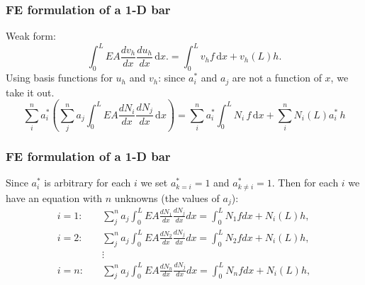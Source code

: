 \documentclass[notes]{beamer}
\begin{document}
\begin{frame}
\frametitle{FE formulation of a 1-D bar}
Weak form:
\begin{equation*}
\int_0^L EA \frac{dv_h}{dx} \frac{du_h}{dx}\, \mathrm{d}x. = \int_0^L v_h f\, \mathrm{d}x + v_h(L)h.
\end{equation*}
Using basis functions for $u_h$ and $v_h$:
since $a_i^*$  and $a_j$ are not a function of $x$, we take it out.
\begin{equation*}
	\sum_i^n a_i^* \left(\sum_j^n a_j \int_0^L EA \frac{dN_i}{dx}\frac{dN_j}{dx}\, \mathrm{d}x \right)  = \sum_i^n a_i^* \int_0^L N_i \,f\,\mathrm{d}x + \sum_i^n N_i(L) a_i^*\,h
\end{equation*}
\end{frame}


\begin{frame}
\frametitle{FE formulation of a 1-D bar}
Since $a_i^*$ is arbitrary for each $i$ we set $a_{k=i}^*=1$ and $a_{k \ne i}^*=1$. Then for each $i$ we have an equation with $n$ unknowns (the values of $a_j$):
\begin{align*}
i = 1: \quad & \sum_j^n {a_j} \int_{0}^{L}EA \frac{dN_1}{dx}\frac{dN_j}{dx} dx = \int_{0}^{L}N_1 f dx + N_i(L)h, \\
i = 2: \quad & \sum_j^n {a_j} \int_{0}^{L}EA \frac{dN_2}{dx}\frac{dN_j}{dx} dx = \int_{0}^{L}N_2 f dx + N_i(L)h, \\
\quad & \vdots \\
i = n: \quad & \sum_j^n {a_j} \int_{0}^{L}EA \frac{dN_n}{dx}\frac{dN_j}{dx} dx = \int_{0}^{L}N_n f dx + N_i(L)h,
\end{align*}
\end{frame}
\end{document}
